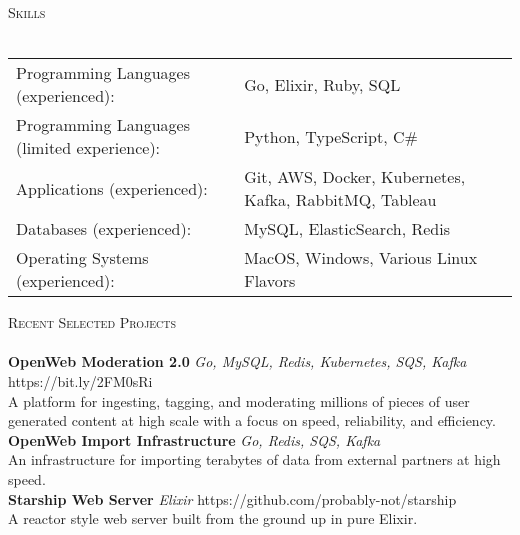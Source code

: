 \documentclass[a4paper]{article}
\newcommand{\lineunder} {
    \vspace*{-8pt} \\
    \hspace*{-18pt} \hrulefill \\
}
\newcommand{\header} [1] {
    {\hspace*{-18pt}\vspace*{6pt} \textsc{#1}}
    \vspace*{-6pt} \lineunder
}
\begin{document}
\header{Skills}
\begin{tabular}{ l l }
	Programming Languages (experienced):        & Go, Elixir, Ruby, SQL                                  \\
	Programming Languages (limited experience): & Python, TypeScript, C\#                                \\
	Applications (experienced):                 & Git, AWS, Docker, Kubernetes, Kafka, RabbitMQ, Tableau \\
	Databases (experienced):                    & MySQL, ElasticSearch, Redis                            \\
	Operating Systems (experienced):            & MacOS, Windows, Various Linux Flavors                  \\
\end{tabular}
\vspace{2mm}

\header{Recent Selected Projects}
{\textbf{OpenWeb Moderation 2.0}} {\sl Go, MySQL, Redis, Kubernetes, SQS, Kafka} \hfill https://bit.ly/2FM0sRi\\
A platform for ingesting, tagging, and moderating millions of pieces of user generated content at high scale with a focus on speed, reliability, and efficiency.\\
\vspace*{2mm}
{\textbf{OpenWeb Import Infrastructure}} {\sl Go, Redis, SQS, Kafka} \\
An infrastructure for importing terabytes of data from external partners at high speed.\\
\vspace*{2mm}
{\textbf{Starship Web Server}} {\sl Elixir} \hfill https://github.com/probably-not/starship\\
A reactor style web server built from the ground up in pure Elixir.\\
\vspace*{2mm}



\ 
\end{document}
